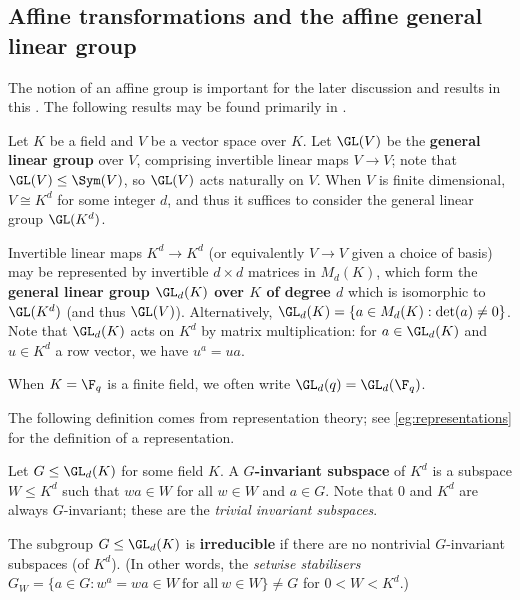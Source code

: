 \subsection{Affine transformations and the affine general linear group}

The notion of an affine group is important for the later discussion and results in this \thesis{}. The following results may be found primarily in \cite{dixon_mortimer_perm_groups1996}.

\begin{definition}\label{def:gl_group}
    Let $K$ be a field and $V$ be a vector space over $K$. Let $\GL(V)$ be the \textbf{general linear group} over $V$, comprising invertible linear maps $V \to V$; note that $\GL(V) \leq \Sym(V)$, so $\GL(V)$ acts naturally on $V$. When $V$ is finite dimensional, $V \cong K^d$ for some integer $d$, and thus it suffices to consider the general linear group $\GL(K^d)$.

    Invertible linear maps $K^d \to K^d$ (or equivalently $V \to V$ given a choice of basis) may be represented by invertible $d \times d$ matrices in $M_d(K)$, which form the \textbf{general linear group $\GL_d(K)$ over $K$ of degree $d$} which is isomorphic to $\GL(K^d)$ (and thus $\GL(V)$). Alternatively, $\GL_d(K) = \{a \in M_d(K) : \det(a) \neq 0\}$. Note that $\GL_d(K)$ acts on $K^d$ by matrix multiplication: for $a \in \GL_d(K)$ and $u \in K^d$ a row vector, we have $u^a = ua$.

    When $K = \F_q$ is a finite field, we often write $\GL_d(q) = \GL_d(\F_q)$.
\end{definition}

The following definition comes from representation theory; see \autoref{eg:representations} for the definition of a representation.

\begin{definition}\label{def:irred_subgroup}
    Let $G \leq \GL_d(K)$ for some field $K$. A \textbf{$G$-invariant subspace} of $K^d$ is a subspace $W \leq K^d$ such that $wa \in W$ for all $w \in W$ and $a \in G$. Note that $0$ and $K^d$ are always $G$-invariant; these are the \textit{trivial invariant subspaces}.

    The subgroup $G \leq \GL_d(K)$ is \textbf{irreducible} if there are no nontrivial $G$-invariant subspaces (of $K^d$). (In other words, the \textit{setwise stabilisers} $G_W = \{a \in G : w^a = wa \in W\ \text{for all}\ w \in W\} \neq G$ for $0 < W < K^d$.)
\end{definition}

